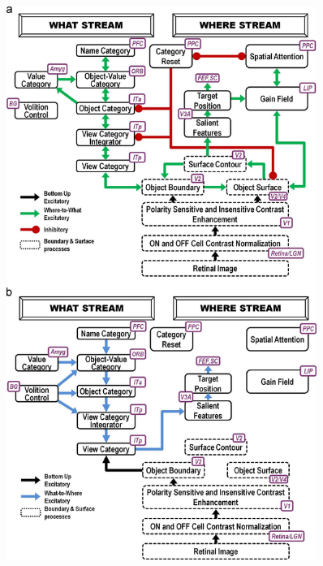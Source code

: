 \documentclass[default]{beamer}
\begin{document}
\begin{frame}
\begin{columns}
\begin{column}{0.4\textwidth}
\begin{figure}
					\includegraphics[width=0.9\textwidth]{grossberg_streams}
				\end{figure}
				
			\end{column}
		\end{columns}
	\end{frame}
\end{document}
